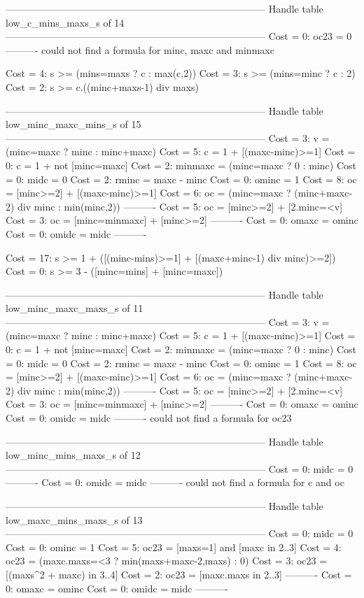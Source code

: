 --------------------------------------------------------------------------------
Handle table low_c_mins_maxs_s of 14
--------------------------------------------------------------------------------
Cost =  0:  oc23    = 0
----------
could not find a formula for minc, maxc and minmaxc

Cost =  4:  s >= (mins=maxs ? c : max(c,2))
Cost =  3:  s >= (mins=minc ? c : 2)
Cost =  2:  s >= c.((minc+maxs-1) div maxs)

--------------------------------------------------------------------------------
Handle table low_minc_maxc_mins_s of 15
--------------------------------------------------------------------------------
Cost =  3:  v       = (minc=maxc ? minc : minc+maxc)
Cost =  5:  c       = 1 + [(maxc-minc)>=1]
Cost =  0:  c       = 1 + not [minc=maxc]
Cost =  2:  minmaxc = (minc=maxc ? 0 : minc)
Cost =  0:  midc    = 0
Cost =  2:  rminc   = maxc - minc
Cost =  0:  ominc   = 1
Cost =  8:  oc      = [minc>=2] + [(maxc-minc)>=1]
Cost =  6:  oc      = (minc=maxc ? (minc+maxc-2) div minc : min(minc,2))
----------
Cost =  5:  oc      = [minc>=2] + [2.minc=<v]
Cost =  3:  oc      = [minc=minmaxc] + [minc>=2]
----------
Cost =  0:  omaxc   = ominc
Cost =  0:  omidc   = midc
----------

Cost = 17:  s >= 1 + ([(minc-mins)>=1] + [(maxc+minc-1) div minc)>=2])
Cost =  0:  s >= 3 - ([minc=mins] + [minc=maxc])

--------------------------------------------------------------------------------
Handle table low_minc_maxc_maxs_s of 11
--------------------------------------------------------------------------------
Cost =  3:  v       = (minc=maxc ? minc : minc+maxc)
Cost =  5:  c       = 1 + [(maxc-minc)>=1]
Cost =  0:  c       = 1 + not [minc=maxc]
Cost =  2:  minmaxc = (minc=maxc ? 0 : minc)
Cost =  0:  midc    = 0
Cost =  2:  rminc   = maxc - minc
Cost =  0:  ominc   = 1
Cost =  8:  oc      = [minc>=2] + [(maxc-minc)>=1]
Cost =  6:  oc      = (minc=maxc ? (minc+maxc-2) div minc : min(minc,2))
----------
Cost =  5:  oc      = [minc>=2] + [2.minc=<v]
Cost =  3:  oc      = [minc=minmaxc] + [minc>=2]
----------
Cost =  0:  omaxc   = ominc
Cost =  0:  omidc   = midc
----------
could not find a formula for oc23


--------------------------------------------------------------------------------
Handle table low_minc_mins_maxs_s of 12
--------------------------------------------------------------------------------
Cost =  0:  midc  = 0
----------
Cost =  0:  omidc = midc
----------
could not find a formula for c and oc


--------------------------------------------------------------------------------
Handle table low_maxc_mins_maxs_s of 13
--------------------------------------------------------------------------------
Cost =  0:  midc  = 0
Cost =  0:  ominc = 1
Cost =  5:  oc23  = [maxs=1] and [maxc in 2..3]
Cost =  4:  oc23  = (maxc.maxs=<3 ? min(maxs+maxc-2,maxs) : 0)
Cost =  3:  oc23  = [(maxs^2 + maxc) in 3..4]
Cost =  2:  oc23  = [maxc.maxs in 2..3]
----------
Cost =  0:  omaxc = ominc
Cost =  0:  omidc = midc
----------
